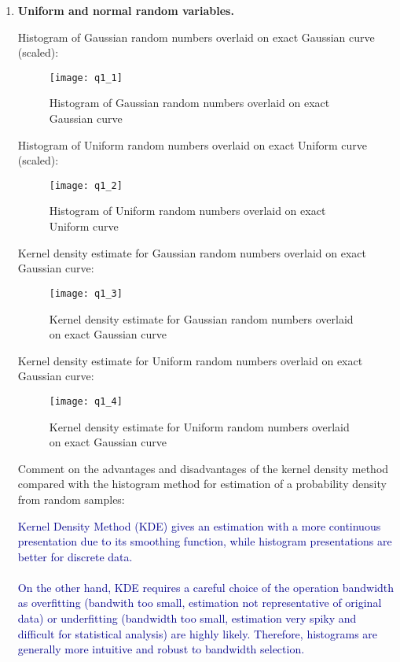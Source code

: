 \documentclass[12pt]{article}
\begin{document}
\begin{enumerate}
\item {\bf Uniform and normal random variables.}

Histogram of Gaussian random numbers overlaid on exact Gaussian curve (scaled):
\begin{figure}[h]
    \centering
    \texttt{[image: q1\_1]}
    \caption{Histogram of Gaussian random numbers overlaid on exact Gaussian curve}
    \label{fig:q1_1}
\end{figure}
\vspace{3in}

Histogram of Uniform random numbers overlaid on exact Uniform curve (scaled):
\begin{figure}[h]
    \centering
    \texttt{[image: q1\_2]}
    \caption{Histogram of Uniform random numbers overlaid on exact Uniform curve}
    \label{fig:q1_2}
\end{figure}
\vspace{1in}

Kernel density estimate for Gaussian random numbers overlaid on exact Gaussian curve:
\begin{figure}[h]
    \centering
    \texttt{[image: q1\_3]}
    \caption{Kernel density estimate for Gaussian random numbers overlaid on exact Gaussian curve}
    \label{fig:q1_3}
\end{figure}
\vspace{3in}



Kernel density estimate for Uniform random numbers overlaid on exact Gaussian curve:
\begin{figure}[h]
    \centering
    \texttt{[image: q1\_4]}
    \caption{Kernel density estimate for Uniform random numbers overlaid on exact Gaussian curve}
    \label{fig:q1_4}
\end{figure}
\vspace{1.5in}

Comment on the advantages and disadvantages of the kernel density method compared with the histogram method for estimation of a probability density from random samples:

\textcolor{darkblue}{Kernel Density Method (KDE) gives an estimation with a more continuous presentation due to its smoothing function, while histogram presentations are better for discrete data.\\
\\
On the other hand, KDE requires a careful choice of the operation bandwidth as overfitting (bandwith too small, estimation not representative of original data) or underfitting (bandwidth too small, estimation very spiky and difficult for statistical analysis) are highly likely. Therefore, histograms are generally more intuitive and robust to bandwidth selection.}
\vspace{3in}




\end{enumerate}
\end{document}
